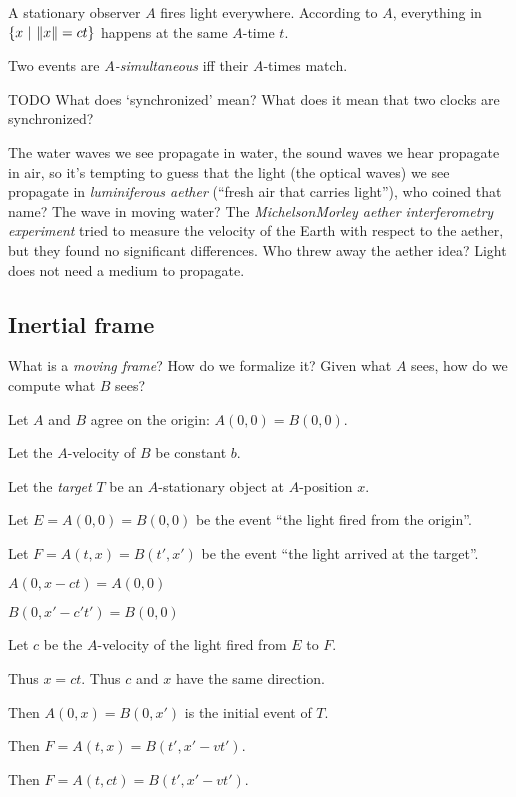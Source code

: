 A stationary observer \(A\) fires light everywhere.
According to \(A\), everything in \(\{ x ~|~ \norm{x} = ct \}\)
happens at the same \(A\)-time \(t\).

Two events are \emph{\(A\)-simultaneous} iff their \(A\)-times match.

TODO
What does `synchronized' mean?
What does it mean that two clocks are synchronized?


The water waves we see propagate in water,
the sound waves we hear propagate in air,
so it's tempting to guess that the light (the optical waves) we see propagate in
\emph{luminiferous aether} (``fresh air that carries light''), who coined that name?
The wave in moving water?
The \emph{Michelson\textendash{}Morley aether interferometry experiment} tried to measure
the velocity of the Earth with respect to the aether,
but they found no significant differences.
Who threw away the aether idea?
Light does not need a medium to propagate.

\subsection{Inertial frame}

What is a \emph{moving frame}?
How do we formalize it?
Given what \(A\) sees, how do we compute what \(B\) sees?

Let \(A\) and \(B\) agree on the origin: \(A(0,0) = B(0,0)\).

Let the \(A\)-velocity of \(B\) be constant \(b\).

Let the \emph{target} \(T\) be an \(A\)-stationary object at \(A\)-position \(x\).

Let \(E = A(0,0) = B(0,0)\) be the event \enquote{the light fired from the origin}.

Let \(F = A(t,x) = B(t',x')\) be the event \enquote{the light arrived at the target}.

\(A(0,x-ct) = A(0,0)\)

\(B(0,x'-c't') = B(0,0)\)

Let \(c\) be the \(A\)-velocity of the light fired from \(E\) to \(F\).

Thus \(x = ct\). Thus \(c\) and \(x\) have the same direction.

Then \(A(0,x) = B(0,x')\) is the initial event of \(T\).

Then \(F = A(t,x) = B(t',x' - vt')\).

Then \(F = A(t,ct) = B(t',x' - vt')\).

